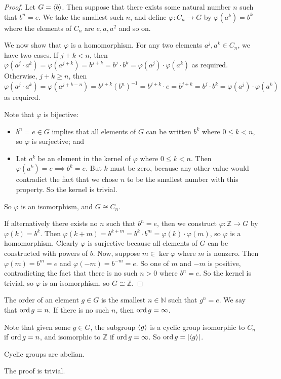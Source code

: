 \begin{proof}
	Let \(G = \left\langle{} b \right\rangle\).
	Then suppose that there exists some natural number \(n\) such that \(b^n = e\).
	We take the smallest such \(n\), and define \(\varphi: C_n \to G\) by \(\varphi(a^k) = b^k\) where the elements of \(C_n\) are \(e, a, a^2\) and so on.

	We now show that \(\varphi\) is a homomorphism.
	For any two elements \(a^j, a^k \in C_n\), we have two cases.
	If \(j + k < n\), then \(\varphi(a^j \cdot a^k) = \varphi(a^{j+k}) = b^{j+k} = b^j \cdot b^k = \varphi(a^j) \cdot \varphi(a^k)\) as required.
	Otherwise, \(j + k \geq n\), then \(\varphi(a^j \cdot a^k) = \varphi(a^{j+k-n}) = b^{j+k}(b^n)^{-1} = b^{j+k}\cdot e = b^{j+k} = b^j \cdot b^k = \varphi(a^j) \cdot \varphi(a^k)\) as required.

	Note that \(\varphi\) is bijective:
	\begin{itemize}
		\item \(b^n = e \in G\) implies that all elements of \(G\) can be written \(b^k\) where \(0 \leq k < n\), so \(\varphi\) is surjective; and
		\item Let \(a^k\) be an element in the kernel of \(\varphi\) where \(0 \leq k < n\).
		      Then \(\varphi(a^k) = e \implies b^k = e\).
		      But \(k\) must be zero, because any other value would contradict the fact that we chose \(n\) to be the smallest number with this property.
		      So the kernel is trivial.
	\end{itemize}
	So \(\varphi\) is an isomorphism, and \(G \cong C_n\).

	If alternatively there exists no \(n\) such that \(b^n = e\), then we construct \(\varphi: \mathbb Z \to G\) by \(\varphi(k) = b^k\).
	Then \(\varphi(k + m) = b^{k+m} = b^k \cdot b^m = \varphi(k) \cdot \varphi(m)\), so \(\varphi\) is a homomorphism.
	Clearly \(\varphi\) is surjective because all elements of \(G\) can be constructed with powers of \(b\).
	Now, suppose \(m \in \ker \varphi\) where \(m\) is nonzero.
	Then \(\varphi(m) = b^m = e\) and \(\varphi(-m) = b^{-m} = e\).
	So one of \(m\) and \(-m\) is positive, contradicting the fact that there is no such \(n>0\) where \(b^n = e\).
	So the kernel is trivial, so \(\varphi\) is an isomorphism, so \(G \cong \mathbb Z\).
\end{proof}

\begin{definition}
	The order of an element \(g\in G\) is the smallest \(n \in \mathbb N\) such that \(g^n = e\).
	We say that \(\operatorname{ord} g = n\).
	If there is no such \(n\), then \(\operatorname{ord} g = \infty\).
\end{definition}
Note that given some \(g \in G\), the subgroup \(\left\langle{} g \right\rangle\) is a cyclic group isomorphic to \(C_n\) if \(\operatorname{ord} g = n\), and isomorphic to \(\mathbb Z\) if \(\operatorname{ord} g = \infty\).
So \(\operatorname{ord} g = \abs{\left\langle{} g \right\rangle}\).
\begin{proposition}
	Cyclic groups are abelian.
\end{proposition}
The proof is trivial.

